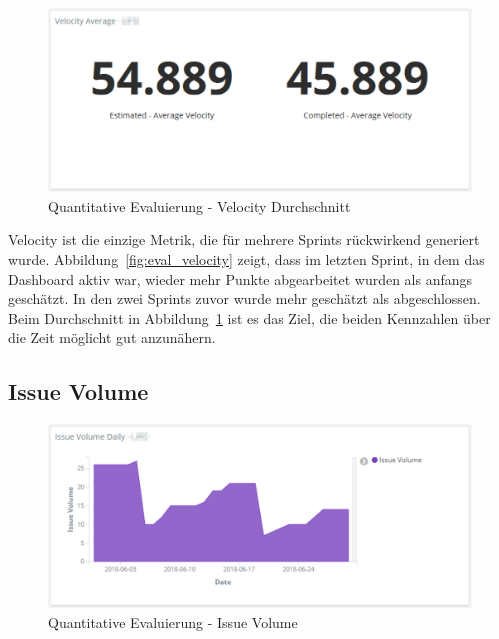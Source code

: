 \begin{savenotes}
    \begin{figure}[H]
      \centering
      \includegraphics[width=1.0\textwidth]{img/eval-velocity-avg.png}
      \caption{Quantitative Evaluierung {-} Velocity Durchschnitt}\label{fig:eval_velocity_avg}
    \end{figure}
\end{savenotes}

Velocity ist die einzige Metrik, die für mehrere Sprints rückwirkend generiert wurde.
Abbildung~\ref{fig:eval_velocity} zeigt, dass im letzten Sprint, in dem das Dashboard aktiv war, wieder mehr Punkte abgearbeitet wurden als anfangs geschätzt.
In den zwei Sprints zuvor wurde mehr geschätzt als abgeschlossen.
Beim Durchschnitt in Abbildung~\ref{fig:eval_velocity_avg} ist es das Ziel, die beiden Kennzahlen über die Zeit möglicht gut anzunähern.

\clearpage
\subsection*{Issue Volume}

\begin{savenotes}
    \begin{figure}[H]
      \centering
      \includegraphics[width=1.0\textwidth]{img/eval-volume.png}
      \caption{Quantitative Evaluierung {-} Issue Volume}\label{fig:eval_issue_volume}
    \end{figure}
\end{savenotes}

